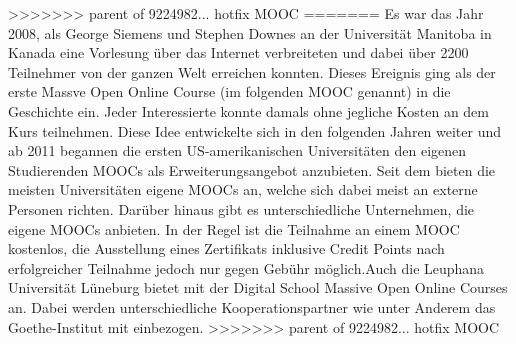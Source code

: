 >>>>>>> parent of 9224982... hotfix MOOC
=======
Es war das Jahr 2008, als George Siemens und Stephen Downes an der Universität Manitoba in Kanada eine Vorlesung über das Internet verbreiteten und dabei über 2200 Teilnehmer von der ganzen Welt erreichen konnten. Dieses Ereignis ging als der erste Massve Open Online Course (im folgenden MOOC genannt) in die Geschichte ein. Jeder Interessierte konnte damals ohne jegliche Kosten an dem Kurs teilnehmen. Diese Idee entwickelte sich in den folgenden Jahren weiter und ab 2011 begannen die ersten US-amerikanischen Universitäten den eigenen Studierenden MOOCs als Erweiterungsangebot anzubieten. Seit dem bieten die meisten Universitäten eigene MOOCs an, welche sich dabei meist an externe Personen richten. Darüber hinaus gibt es unterschiedliche Unternehmen, die eigene MOOCs anbieten. In der Regel ist die Teilnahme an einem MOOC kostenlos, die Ausstellung eines Zertifikats inklusive Credit Points nach erfolgreicher Teilnahme jedoch nur gegen Gebühr möglich.\newline Auch die Leuphana Universität Lüneburg bietet mit der Digital School Massive Open Online Courses an. Dabei werden unterschiedliche Kooperationspartner wie unter Anderem das Goethe-Institut mit einbezogen.
>>>>>>> parent of 9224982... hotfix MOOC



